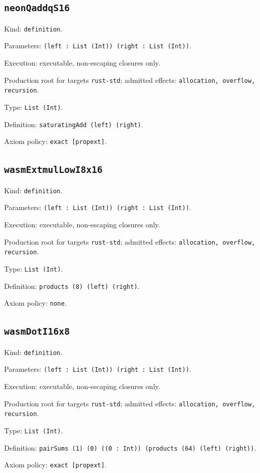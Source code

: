 \documentclass[11pt]{article}
\begin{document}
\subsection*{\texttt{neonQaddqS16}}
\noindent Kind: \texttt{definition}.\par
\noindent Parameters: \texttt{(left : List (Int)) (right : List (Int))}.\par
\noindent Execution: executable, non-escaping closures only.\par
\noindent Production root for targets \texttt{rust-std}; admitted effects: \texttt{allocation, overflow, recursion}.\par
\noindent Type: \texttt{List (Int)}.\par
\noindent Definition: \texttt{saturatingAdd (left) (right)}.\par
\noindent Axiom policy: \texttt{exact [propext]}.\par
\subsection*{\texttt{wasmExtmulLowI8x16}}
\noindent Kind: \texttt{definition}.\par
\noindent Parameters: \texttt{(left : List (Int)) (right : List (Int))}.\par
\noindent Execution: executable, non-escaping closures only.\par
\noindent Production root for targets \texttt{rust-std}; admitted effects: \texttt{allocation, overflow, recursion}.\par
\noindent Type: \texttt{List (Int)}.\par
\noindent Definition: \texttt{products (8) (left) (right)}.\par
\noindent Axiom policy: \texttt{none}.\par
\subsection*{\texttt{wasmDotI16x8}}
\noindent Kind: \texttt{definition}.\par
\noindent Parameters: \texttt{(left : List (Int)) (right : List (Int))}.\par
\noindent Execution: executable, non-escaping closures only.\par
\noindent Production root for targets \texttt{rust-std}; admitted effects: \texttt{allocation, overflow, recursion}.\par
\noindent Type: \texttt{List (Int)}.\par
\noindent Definition: \texttt{pairSums (1) (0) ((0 : Int)) (products (64) (left) (right))}.\par
\noindent Axiom policy: \texttt{exact [propext]}.\par
\end{document}
